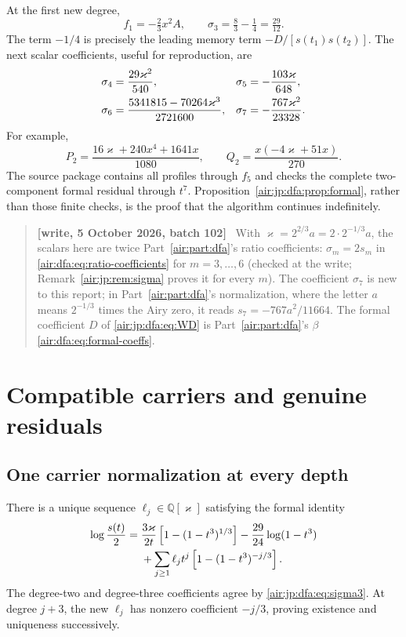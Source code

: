 \documentclass[11pt,letterpaper]{article}
\numberwithin{equation}{section}
\theoremstyle{remark}
\newenvironment{writenotejp}{\par\smallskip\begin{quote}\small\textbf{[write, 5 October 2026, batch 102]}\ }{\end{quote}\smallskip}
\begin{document}
At the first new degree,
\begin{equation}\label{air:jp:dfa:eq:sigma3}
 f_1=-\tfrac23x^2A,\qquad \sigma_3=\tfrac83-\tfrac14=\tfrac{29}{12}.
\end{equation}
The term $-1/4$ is precisely the leading memory term $-D/[s(t_1)s(t_2)]$. The next scalar coefficients, useful for reproduction, are
\begin{align}
 \sigma_4&=\frac{29\varkappa^2}{540},&
 \sigma_5&=-\frac{103\varkappa}{648},\notag\\
 \sigma_6&=\frac{5341815-70264\varkappa^3}{2721600},&
 \sigma_7&=-\frac{767\varkappa^2}{23328}.\label{air:jp:dfa:eq:sigmas}
\end{align}
For example,
\[
 P_2=\frac{16\varkappa+240x^4+1641x}{1080},\qquad
 Q_2=\frac{x(-4\varkappa+51x)}{270}.
\]
The source package contains all profiles through $f_5$ and checks the complete two-component formal residual through $t^7$. Proposition~\ref{air:jp:dfa:prop:formal}, rather than those finite checks, is the proof that the algorithm continues indefinitely.
\begin{writenotejp}
With $\varkappa=2^{2/3}a=2\cdot2^{-1/3}a$, the scalars here are twice Part~\ref{air:part:dfa}'s ratio coefficients: $\sigma_m=2s_m$ in \eqref{air:dfa:eq:ratio-coefficients} for $m=3,\ldots,6$ (checked at the write; Remark~\ref{air:jp:rem:sigma} proves it for every $m$). The coefficient $\sigma_7$ is new to this report; in Part~\ref{air:part:dfa}'s normalization, where the letter $a$ means $2^{-1/3}$ times the Airy zero, it reads $s_7=-767a^2/11664$. The formal coefficient $D$ of \eqref{air:jp:dfa:eq:WD} is Part~\ref{air:part:dfa}'s $\beta$ \eqref{air:dfa:eq:formal-coeffs}.
\end{writenotejp}

\section{Compatible carriers and genuine residuals}\label{air:jp:dfa:sec:residual}
\subsection{One carrier normalization at every depth}
There is a unique sequence $\ell_j\in\mathbb Q[\varkappa]$ satisfying the formal identity
\begin{align}
 \log\frac{s(t)}2={}&\frac{3\varkappa}{2t}\left[1-(1-t^3)^{1/3}\right]
 -\frac{29}{24}\log(1-t^3)\notag\\
 &+\sum_{j\ge1}\ell_jt^j\left[1-(1-t^3)^{-j/3}\right].\label{air:jp:dfa:eq:carrieridentity}
\end{align}
The degree-two and degree-three coefficients agree by \eqref{air:jp:dfa:eq:sigma3}. At degree $j+3$, the new $\ell_j$ has nonzero coefficient $-j/3$, proving existence and uniqueness successively.
\end{document}

